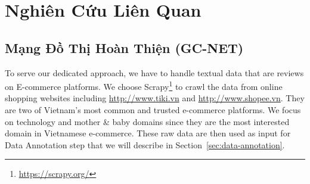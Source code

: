 \chapter{Nghiên Cứu Liên Quan}
\label{chap:Nghiên Cứu Liên Quan}



\section{Mạng Đồ Thị Hoàn Thiện (GC-NET)}
\label{sec:Mạng Đồ Thị Hoàn Thiện}

To serve our dedicated approach, we have to handle textual data that are reviews on E-commerce platforms. We choose Scrapy\footnote{\url{https://scrapy.org/}} to crawl the data from online shopping websites including \url{http://www.tiki.vn} and \url{http://www.shopee.vn}. They are two of Vietnam's most common and trusted e-commerce platforms.
We focus on technology and mother \& baby domains since they are the most interested domain in Vietnamese e-commerce.
These raw data are then used as input for Data Annotation step that we will describe in Section~\ref{sec:data-annotation}.

